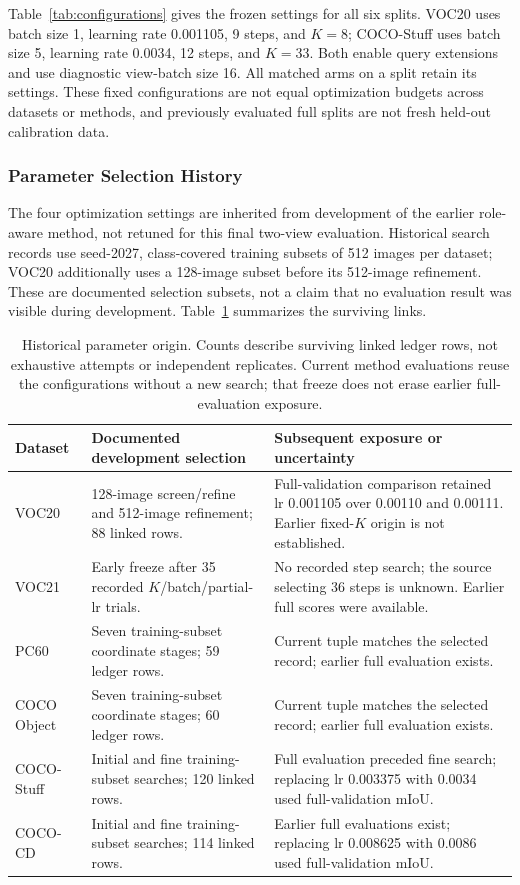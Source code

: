 

Table~\ref{tab:configurations} gives the frozen settings for all six splits. VOC20 uses batch size 1, learning rate 0.001105, 9 steps, and $K=8$; COCO-Stuff uses batch size 5, learning rate 0.0034, 12 steps, and $K=33$. Both enable query extensions and use diagnostic view-batch size 16. All matched arms on a split retain its settings. These fixed configurations are not equal optimization budgets across datasets or methods, and previously evaluated full splits are not fresh held-out calibration data.

\subsubsection{Parameter Selection History}
The four optimization settings are inherited from development of the earlier role-aware method, not retuned for this final two-view evaluation. Historical search records use seed-2027, class-covered training subsets of 512 images per dataset; VOC20 additionally uses a 128-image subset before its 512-image refinement. These are documented selection subsets, not a claim that no evaluation result was visible during development. Table~\ref{tab:selection-history} summarizes the surviving links.

\begin{table}[t]
\caption{Historical parameter origin. Counts describe surviving linked ledger rows, not exhaustive attempts or independent replicates. Current method evaluations reuse the configurations without a new search; that freeze does not erase earlier full-evaluation exposure.}
\label{tab:selection-history}
\centering\small
\begin{tabular}{@{}lp{}p{}@{}}
\toprule
Dataset & Documented development selection & Subsequent exposure or uncertainty \\
\midrule
VOC20 & 128-image screen/refine and 512-image refinement; 88 linked rows. & Full-validation comparison retained lr 0.001105 over 0.00110 and 0.00111. Earlier fixed-$K$ origin is not established. \\
VOC21 & Early freeze after 35 recorded $K$/batch/partial-lr trials. & No recorded step search; the source selecting 36 steps is unknown. Earlier full scores were available. \\
PC60 & Seven training-subset coordinate stages; 59 ledger rows. & Current tuple matches the selected record; earlier full evaluation exists. \\
COCO Object & Seven training-subset coordinate stages; 60 ledger rows. & Current tuple matches the selected record; earlier full evaluation exists. \\
COCO-Stuff & Initial and fine training-subset searches; 120 linked rows. & Full evaluation preceded fine search; replacing lr 0.003375 with 0.0034 used full-validation mIoU. \\
COCO-CD & Initial and fine training-subset searches; 114 linked rows. & Earlier full evaluations exist; replacing lr 0.008625 with 0.0086 used full-validation mIoU. \\
\bottomrule
\end{tabular}
\end{table}

